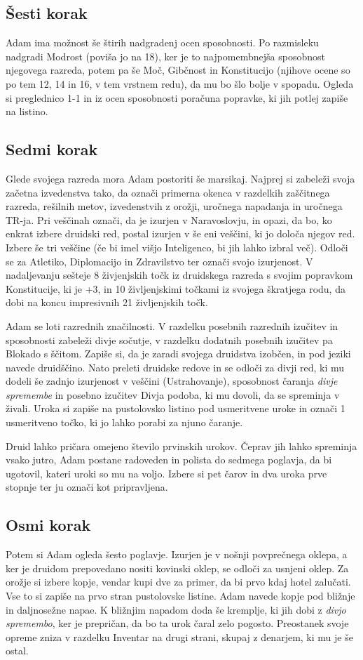 \subsection{Šesti korak}
Adam ima možnost še štirih nadgradenj ocen sposobnosti. Po razmisleku nadgradi Modrost (poviša jo na 18), ker je to najpomembnejša sposobnost njegovega razreda, potem pa še Moč, Gibčnost in Konstitucijo (njihove ocene so po tem 12, 14 in 16, v tem vrstnem redu), da mu bo šlo bolje v spopadu. Ogleda si preglednico 1-1 in iz ocen sposobnosti poračuna popravke, ki jih potlej zapiše na listino.

\subsection{Sedmi korak}
Glede svojega razreda mora Adam postoriti še marsikaj. Najprej si zabeleži svoja začetna izvedenstva tako, da označi primerna okenca v razdelkih zaščitnega razreda, rešilnih metov, izvedenstvih z orožji, uročnega napadanja in uročnega TR-ja. Pri veščinah označi, da je izurjen v Naravoslovju, in opazi, da bo, ko enkrat izbere druidski red, postal izurjen v še eni veščini, ki jo določa njegov red. Izbere še tri veščine (če bi imel višjo Inteligenco, bi jih lahko izbral več). Odloči se za Atletiko, Diplomacijo in Zdravilstvo ter označi svojo izurjenost. V nadaljevanju sešteje 8 živjenjskih točk iz druidskega razreda s svojim popravkom Konstitucije, ki je +3, in 10 življenjskimi točkami iz svojega škratjega rodu, da dobi na koncu impresivnih 21 življenjskih točk.

Adam se loti razrednih značilnosti. V razdelku posebnih razrednih izučitev in sposobnosti zabeleži divje sočutje, v razdelku dodatnih posebnih izučitev pa Blokado s ščitom. Zapiše si, da je zaradi svojega druidstva izobčen, in pod jeziki navede druidščino. Nato preleti druidske redove in se odloči za divji red, ki mu dodeli še zadnjo izurjenost v veščini (Ustrahovanje), sposobnost čaranja \textit{divje spremembe} in posebno izučitev Divja podoba, ki mu dovoli, da se spreminja v živali. Uroka si zapiše na pustolovsko listino pod usmeritvene uroke in označi 1 usmeritveno točko, ki jo lahko porabi za njuno čaranje.

Druid lahko pričara omejeno število prvinskih urokov. Čeprav jih lahko spreminja vsako jutro, Adam postane radoveden in polista do sedmega poglavja, da bi ugotovil, kateri uroki so mu na voljo. Izbere si pet čarov in dva uroka prve stopnje ter ju označi kot pripravljena.

\subsection{Osmi korak}
Potem si Adam ogleda šesto poglavje. Izurjen je v nošnji povprečnega oklepa, a ker je druidom prepovedano nositi kovinski oklep, se odloči za usnjeni oklep. Za orožje si izbere kopje, vendar kupi dve za primer, da bi prvo kdaj hotel zalučati. Vse to si zapiše na prvo stran pustolovske listine. Adam navede kopje pod bližnje in daljnosežne napae. K bližnjim napadom doda še kremplje, ki jih dobi z \textit{divjo spremembo}, ker je prepričan, da bo ta urok čaral zelo pogosto. Preostanek svoje opreme zniza v razdelku Inventar na drugi strani, skupaj z denarjem, ki mu je še ostal.

